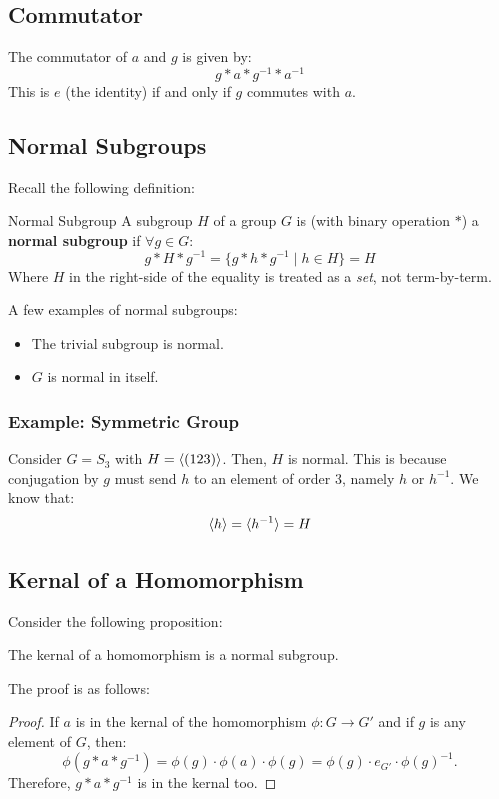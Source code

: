 \documentclass[letterpaper]{article}
\begin{document}
\subsection{Commutator}
The commutator of $a$ and $g$ is given by: 
\[g * a * g^{-1} * a^{-1}\]
This is $e$ (the identity) if and only if $g$ commutes with $a$. 

\subsection{Normal Subgroups}
Recall the following definition:
\begin{definition}{Normal Subgroup}{}
    A subgroup $H$ of a group $G$ is (with binary operation $*$) a \textbf{normal subgroup} if $\forall g \in G$:
    \[g * H * g^{-1} = \{g * h * g^{-1} \mid h \in H\} = H\]
    Where $H$ in the right-side of the equality is treated as a \emph{set}, not term-by-term. %
\end{definition}

A few examples of normal subgroups: 
\begin{itemize}
    \item The trivial subgroup is normal. 
    \item $G$ is normal in itself. 
\end{itemize}

\subsubsection{Example: Symmetric Group}
Consider $G = S_3$ with $H = \langle (123) \rangle$. Then, $H$ is normal. This is because conjugation by $g$ must send $h$ to an element of order 3, namely $h$ or $h^{-1}$. We know that: 
\[\langle h \rangle = \langle h^{-1} \rangle = H\]

\subsection{Kernal of a Homomorphism}
Consider the following proposition: 
\begin{proposition}
    The kernal of a homomorphism is a normal subgroup.
\end{proposition}

The proof is as follows: 
\begin{mdframed}
    \begin{proof}
        If $a$ is in the kernal of the homomorphism $\phi: G \to G'$ and if $g$ is any element of $G$, then: 
        \[\phi(g * a * g^{-1}) = \phi(g) \cdot \phi(a) \cdot \phi(g) = \phi(g) \cdot e_{G'} \cdot \phi(g)^{-1}.\]
        Therefore, $g * a * g^{-1}$ is in the kernal too. 
    \end{proof}
\end{mdframed}
\end{document}
